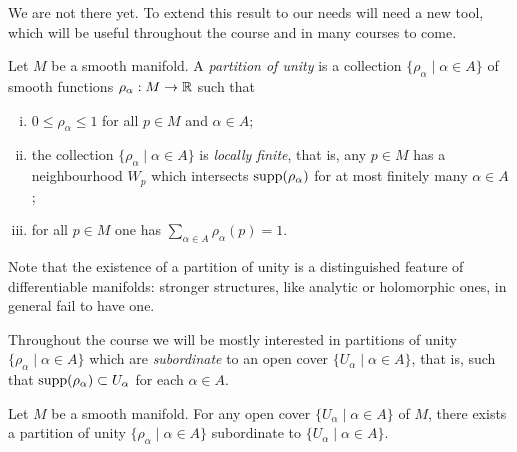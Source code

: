 We are not there yet. To extend this result to our needs will need a new tool, which will be useful throughout the course and in many courses to come.

\begin{definition}
	Let $M$ be a smooth manifold. A \emph{partition of unity} is a collection $\{\rho_\alpha \mid \alpha\in A\}$ of smooth functions $\rho_\alpha:M\to\mathbb{R}$ such that
	\begin{enumerate}[(i)]
		\item $0 \leq \rho_\alpha \leq 1$ for all $p\in M$ and $\alpha\in A$;
		\item\label{def:pou.2} the collection $\{\rho_\alpha \mid \alpha\in A\}$ is \emph{locally finite}, that is, any $p\in M$ has a neighbourhood $W_p$ which intersects $\operatorname{supp}(\rho_\alpha)$ for at most finitely many $\alpha\in A$;
		\item for all $p\in M$ one has $\sum_{\alpha\in A} \rho_\alpha(p) = 1$.
	\end{enumerate}
\end{definition}

\begin{remark}
	Note that the existence of a partition of unity is a distinguished feature of differentiable manifolds: stronger structures, like analytic or holomorphic ones, in general fail to have one.
\end{remark}

Throughout the course we will be mostly interested in partitions of unity $\{\rho_\alpha \mid \alpha\in A\}$ which are \emph{subordinate} to an open cover $\{U_\alpha\mid\alpha\in A\}$, that is, such that $\operatorname{supp}(\rho_\alpha) \subset U_\alpha$ for each $\alpha\in A$.

\begin{theorem}\label{thm:partitionof1}
	Let $M$ be a smooth manifold. For any open cover $\{U_\alpha\mid\alpha\in A\}$ of $M$, there exists a partition of unity $\{\rho_\alpha \mid \alpha\in A\}$ subordinate to $\{U_\alpha\mid\alpha\in A\}$.
\end{theorem}

